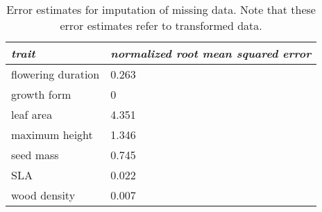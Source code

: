 \begin{table}[ht]
\tiny
\centering
\caption[Error estimates for imputation of missing data.]{Error estimates for imputation of missing data. Note that these error estimates refer to transformed data.}
\label{Ch4sup_T6}
\begin{tabu} to \textwidth {XX}
\hline
\textit{trait}              & \textit{normalized root mean squared error} \\ \hline

flowering duration & 0.263        \\
growth form        & 0            \\
leaf area          & 4.351        \\
maximum height     & 1.346        \\
seed mass          & 0.745        \\
SLA                & 0.022        \\
wood density       & 0.007        \\ \hline
\end{tabu}
\end{table}
